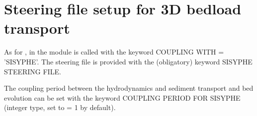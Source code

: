 \section{Steering file setup for 3D bedload transport}
As for , in  the module \sisyphe{} is called with the keyword {\ttfamily COUPLING WITH = 'SISYPHE'}. The \sisyphe{} steering file is provided with the (obligatory) keyword {\ttfamily SISYPHE STEERING FILE}.

The coupling period between the hydrodynamics and sediment transport and bed evolution can be set with the keyword {\ttfamily COUPLING PERIOD FOR SISYPHE} (integer type, set to {\ttfamily = 1} by default).


